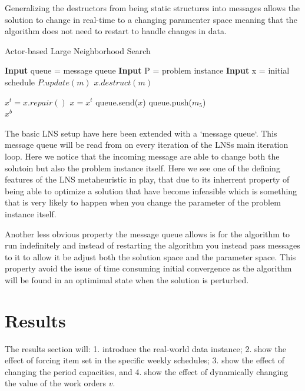 \documentclass[preprint,12pt,authoryear]{elsarticle}
\begin{document}
Generalizing the destructors from being static structures into messages
allows the solution to change in real-time to a changing paramenter space meaning
that the algorithm does not need to restart to handle changes in data. 

\begin{algorithm}[H]
\caption{Actor-based Large Neighborhood Search}  \label{algo1}
\begin{algorithmic}[1]
\State \textbf{Input} queue = message queue
\State \textbf{Input} P     = problem instance
\State \textbf{Input} x     = initial schedule
		\State $P.update(m)$
        \State $x.destruct(m)$
    \EndWhile
	
    \State $x^t = x.repair()$
                                 \label{alg:objective_start}
        \State $x = x^t$
		\State queue.send($x$)
    \EndIf                                           \label{alg:objective_end}
	\State queue.push($m_5$)
\EndWhile\\
\Return $x^b$
\end{algorithmic}
\end{algorithm}

The basic LNS setup have here been extended with a `message queue`. This message queue will be read from on every iteration of the LNSs main iteration loop. Here we notice that the 
incoming message are able to change both the solutoin but also the problem instance itself. Here we see one of the defining features of the LNS metaheuristic in play, that due to its inherrent 
property of being able to optimize a solution that have become infeasible which is something that is very likely to happen when you change the parameter of the problem instance itself. 

Another less obvious property the message queue allows is for the algorithm to run indefinitely and instead of restarting the algorithm you instead pass 
messages to it to allow it be adjust both the solution space and the parameter space.
This property avoid the issue of time consuming initial convergence as the algorithm will be found in an optimimal state when the solution is perturbed.  

\section{Results}
\label{sec:3-results}
The results section will: 1. introduce the real-world data instance; 2. show the effect of forcing item set in the specific weekly schedules; 3. show the effect of changing the 
period capacities, and 4. show the effect of dynamically changing the value of the work orders $v$. 
\end{document}
